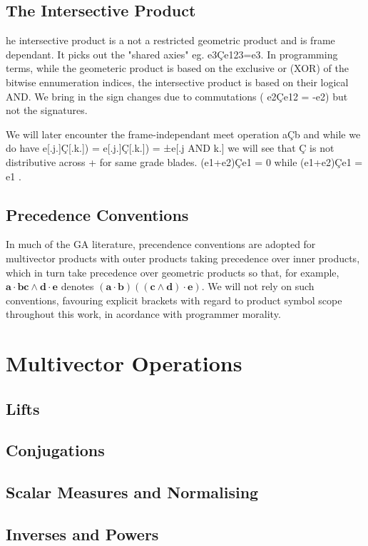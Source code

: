 \documentclass[a4paper]{book}
\numberwithin{equation}{chapter}
\begin{document}
    \section{The Intersective Product}

he intersective product is a not a restricted geometric product and is frame dependant. It picks out the "shared axies" eg. e3Çe123=e3. In programming terms, while the geometeric product is based on the exclusive or (XOR) of the bitwise ennumeration indices, the intersective product is based on their logical AND. We bring in the sign changes due to commutations ( e2Çe12 = -e2) but not the signatures.

    We will later encounter the frame-independant meet operation aÇb and while we do have e[.j.]Ç[.k.]) = e[.j.]Ç[.k.]) = ±e[.j AND k.] we will see that Ç is not distributive across + for same grade blades. (e1+e2)Çe1 = 0 while (e1+e2)Çe1 = e1 . 

    \section{Precedence Conventions}

In much of the GA literature, precendence conventions are adopted for multivector products with outer 
products taking precedence over inner products, which in turn take precedence over geometric products so 
that, for example, $\mathbf{a\cdot bc \wedge d\cdot e}$ denotes $\mathbf{(a\cdot b)((c\wedge d)\cdot e)}$.
We will not rely on such conventions, favouring explicit brackets with regard to product symbol scope 
throughout this work, in acordance with programmer morality.

    
    \chapter{Multivector Operations}

    \section{Lifts}
    \section{Conjugations}
    \section{Scalar Measures and Normalising}
    \section{Inverses and Powers}
\end{document}
